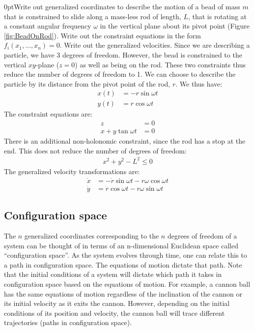 \begin{example}{0pt}{Write out generalized coordinates to describe the motion of a bead of mass $m$ that is constrained to slide along a mass-less rod of length, $L$, that is rotating at a constant angular frequency $\omega$ in the vertical plane about its pivot point (Figure \ref{fig:BeadOnRod}). Write out the constraint equations in the form $f_i(x_1,\dots ,x_n)=0$. Write out the generalized velocities.}{}
Since we are describing a particle, we have 3 degrees of freedom. However, the bead is constrained to the vertical $xy$-plane ($z=0$) as well as being on the rod. These two constraints thus reduce the number of degrees of freedom to 1. We can choose to describe the particle by its distance from the pivot point of the rod, $r$. We thus have:
\begin{align*}
x(t) &=-r\sin{\omega t}\nonumber\\
y(t) &=r\cos{\omega t}
\end{align*}
The constraint equations are:
\begin{align*}
z&=0\nonumber\\
x+y\tan{\omega t}&=0
\end{align*}
There is an additional non-holonomic constraint, since the rod has a stop at the end. This does not reduce the number of degrees of freedom:
\begin{align*}
x^2+y^2-L^2\leq 0
\end{align*}
The generalized velocity transformations are:
\begin{align*}
\dot{x} &=-\dot{r}\sin{\omega t}-r\omega\cos{\omega t}\\
\dot{y} &=\dot{r}\cos{\omega t}-r\omega\sin{\omega t}
\end{align*}
\end{example}


\subsection{Configuration space}
The $n$ generalized coordinates corresponding to the $n$ degrees of freedom of a system can be thought of in terms of an n-dimensional Euclidean space called ``configuration space''. As the system evolves through time, one can relate this to a path in configuration space. The equations of motion dictate that path. Note that the initial conditions of a system will dictate which path it takes in configuration space based on the equations of motion. For example, a cannon ball has the same equations of motion regardless of the inclination of the cannon or its initial velocity as it exits the cannon. However, depending on the initial conditions of its position and velocity, the cannon ball will trace different trajectories (paths in configuration space). 




